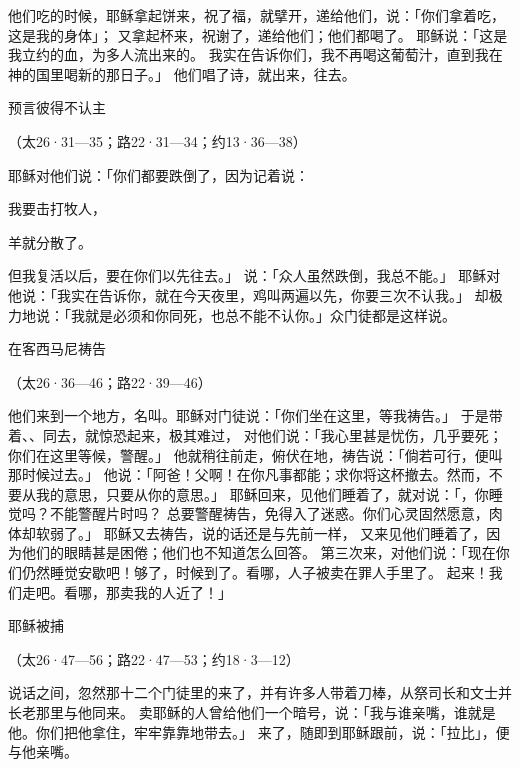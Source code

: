 {\par }{\PP {}他们吃的时候，耶稣拿起饼来，祝了福，就擘开，递给他们，说：「你们拿着吃，这是我的身体」；
又拿起杯来，祝谢了，递给他们；他们都喝了。
耶稣说：「这是我立约的血，为多人流出来的。
我实在告诉你们，我不再喝这葡萄汁，直到我在　神的国里喝新的那日子。」
他们唱了诗，就出来，往{}去。
\par }{\SH 预言彼得不认主
\par }{\R （太26·31—35；路22·31—34；约13·36—38）
\par }{\PP {}耶稣对他们说：「你们都要跌倒了，因为{}记着说：
\par }{\Q 我要击打牧人，
\par }{\Q 羊就分散了。
\par }{\MM {}但我复活以后，要在你们以先往{}去。」
说：「众人虽然跌倒，我总不能。」
耶稣对他说：「我实在告诉你，就在今天夜里，鸡叫两遍以先，你要三次不认我。」
却极力地说：「我就是必须和你同死，也总不能不认你。」众门徒都是这样说。
\par }{\SH 在客西马尼祷告
\par }{\R （太26·36—46；路22·39—46）
\par }{\PP {}他们来到一个地方，名叫{}。耶稣对门徒说：「你们坐在这里，等我祷告。」
于是带着{}、{}、{}同去，就惊恐起来，极其难过，
对他们说：「我心里甚是忧伤，几乎要死；你们在这里等候，警醒。」
他就稍往前走，俯伏在地，祷告说：「倘若可行，便叫那时候过去。」
他说：「阿爸！父啊！在你凡事都能；求你将这杯撤去。然而，不要从我的意思，只要从你的意思。」
耶稣回来，见他们睡着了，就对{}说：「{}，你睡觉吗？不能警醒片时吗？
总要警醒祷告，免得入了迷惑。你们心灵固然愿意，肉体却软弱了。」
耶稣又去祷告，说的话还是与先前一样，
又来见他们睡着了，因为他们的眼睛甚是困倦；他们也不知道怎么回答。
第三次来，对他们说：「现在你们仍然睡觉安歇吧！够了，时候到了。看哪，人子被卖在罪人手里了。
起来！我们走吧。看哪，那卖我的人近了！」
\par }{\SH 耶稣被捕
\par }{\R （太26·47—56；路22·47—53；约18·3—12）
\par }{\PP {}说话之间，忽然那十二个门徒里的{}来了，并有许多人带着刀棒，从祭司长和文士并长老那里与他同来。
卖耶稣的人曾给他们一个暗号，说：「我与谁亲嘴，谁就是他。你们把他拿住，牢牢靠靠地带去。」
来了，随即到耶稣跟前，说：「拉比」，便与他亲嘴。
}
